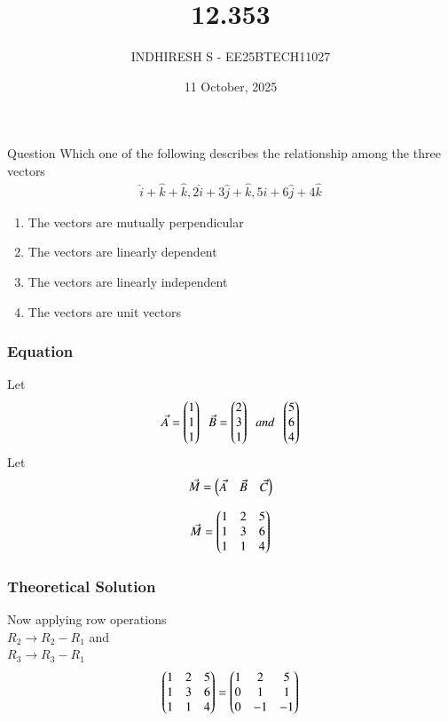 \documentclass{beamer}
\title %
    {12.353}
\date{11 October, 2025}
\author %
    {INDHIRESH S - EE25BTECH11027}
\begin{document}
    
    \frame{\titlepage}
    
    \begin{frame}{Question}
   Which one of the following describes the relationship among the three vectors
\begin{align*}
    \hat{i}+\hat{k}+\hat{k},2\hat{i}+3\hat{j}+\hat{k},5\hat{i}+6\hat{j}+4\hat{k}
\end{align*}
\begin{enumerate}
    \item The vectors are mutually perpendicular
    \item The vectors are linearly dependent
    \item The vectors are linearly independent
    \item The vectors are unit vectors
\end{enumerate}
    \end{frame}
    
    \begin{frame}[allowframebreaks] 
    \frametitle{Equation}
        \centering
        \label{tab:parameters}
Let
\begin{align}
\Vec{A}=\begin{pmatrix}1\\1\\1\end{pmatrix}\;\;\Vec{B}=\begin{pmatrix}2\\3\\1\end{pmatrix}\;\;and\;\;\begin{pmatrix}5\\6\\4\end{pmatrix}
\end{align}
Let 
\begin{align}
   \Vec{M}=\begin{pmatrix}\Vec{A}&\Vec{B}&\Vec{C}\end{pmatrix}
\end{align}

\begin{align}
    \Vec{M}=\begin{pmatrix}1&2&5\\1&3&6\\1&1&4\end{pmatrix}
\end{align}


    \end{frame}
    
    \begin{frame}
    \frametitle{Theoretical Solution}
  Now applying row operations\\
$R_2\longrightarrow R_2-R_1$ and \\
$R_3\longrightarrow R_3-R_1$
\begin{align}
   \begin{pmatrix}1&2&5\\1&3&6\\1&1&4\end{pmatrix}=\begin{pmatrix}1&2&5\\0&1&1\\0&-1&-1\end{pmatrix}
\end{align}



    \end{frame}
    
\end{document}
